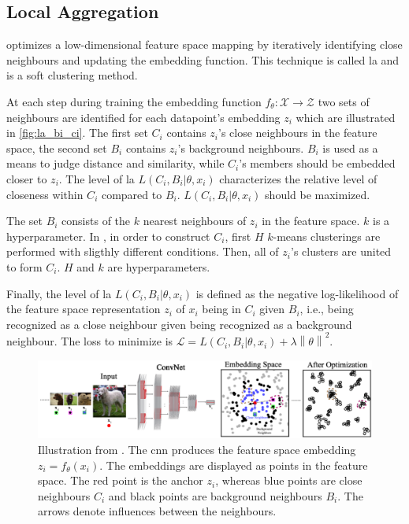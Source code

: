 \subsection{Local Aggregation}\label{subsec:local_aggregation}

\citet{local_aggr_2019} optimizes a low-dimensional feature space mapping by 
iteratively identifying close neighbours and updating the embedding function.
This technique is called \ac{la} and is a soft clustering method.

At each step during training the embedding function $f_\theta: \mathcal{X} \rightarrow \mathcal{Z}$ 
two sets of neighbours are identified for each datapoint's embedding $z_i$ 
which are illustrated in \autoref{fig:la_bi_ci}.
The first set $C_i$ contains $z_i$'s close neighbours in the feature space,
the second set $B_i$ contains $z_i$'s background neighbours.
$B_i$ is used as a means to judge distance and similarity, 
while $C_i$'s members should be embedded closer to $z_i$.
The level of \ac{la} $L(C_i,B_i | \theta, x_i)$ 
characterizes the relative level of closeness within $C_i$ compared to $B_i$.
$L(C_i,B_i | \theta, x_i)$ should be maximized.

The set $B_i$ consists of the $k$ nearest neighbours of $z_i$ in the feature space.
$k$ is a hyperparameter.
In \citet{local_aggr_2019}, in order to construct $C_i$, 
first $H$ $k$-means clusterings are performed with sligthly different conditions.
Then, all of $z_i$'s clusters are united to form $C_i$.
$H$ and $k$ are hyperparameters.

Finally, the level of \ac{la} $L(C_i,B_i | \theta, x_i)$ is defined as the negative log-likelihood 
of the feature space representation $z_i$ of $x_i$ being in $C_i$ given $B_i$, 
i.e., being recognized as a close neighbour given being recognized as a background neighbour.
The loss to minimize is $\mathcal{L} = L(C_i,B_i | \theta, x_i) + \lambda \left\| \theta \right\|^2$.

\begin{figure}[h] %
    \centering
    \includegraphics[width=360pt]{images/la_neighbourhoods.png}
    \caption{Illustration from \citet{local_aggr_2019}.
    The \ac{cnn} produces the feature space embedding $z_i = f_\theta(x_i)$.
    The embeddings are displayed as points in the feature space.
    The red point is the anchor $z_i$, 
    whereas blue points are close neighbours $C_i$ and
    black points are background neighbours $B_i$.
    The arrows denote influences between the neighbours.}
    \label{fig:la_bi_ci}
\end{figure}